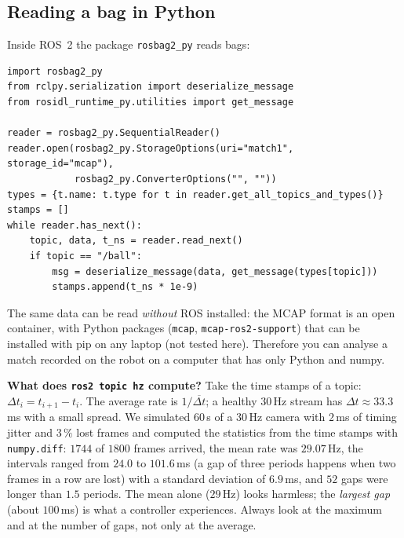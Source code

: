 \subsection*{Reading a bag in Python}
Inside ROS~2 the package \verb!rosbag2_py! reads bags:
\begin{verbatim}
import rosbag2_py
from rclpy.serialization import deserialize_message
from rosidl_runtime_py.utilities import get_message

reader = rosbag2_py.SequentialReader()
reader.open(rosbag2_py.StorageOptions(uri="match1", storage_id="mcap"),
            rosbag2_py.ConverterOptions("", ""))
types = {t.name: t.type for t in reader.get_all_topics_and_types()}
stamps = []
while reader.has_next():
    topic, data, t_ns = reader.read_next()
    if topic == "/ball":
        msg = deserialize_message(data, get_message(types[topic]))
        stamps.append(t_ns * 1e-9)
\end{verbatim}
The same data can be read \emph{without} ROS installed: the MCAP format is an open container, with Python packages (\verb!mcap!, \verb!mcap-ros2-support!) that can be installed with pip on any laptop (not tested here). Therefore you can analyse a match recorded on the robot on a computer that has only Python and numpy.

\begin{example}
\textbf{What does \verb!ros2 topic hz! compute?} Take the time stamps of a topic: $\Delta t_i=t_{i+1}-t_i$. The average rate is $1/\overline{\Delta t}$; a healthy $30$\,Hz stream has $\Delta t\approx33.3$\,ms with a small spread. We simulated $60$\,s of a $30$\,Hz camera with $2$\,ms of timing jitter and $3\,\%$ lost frames and computed the statistics from the time stamps with \verb!numpy.diff!: $1744$ of $1800$ frames arrived, the mean rate was $29.07$\,Hz, the intervals ranged from $24.0$ to $101.6$\,ms (a gap of three periods happens when two frames in a row are lost) with a standard deviation of $6.9$\,ms, and $52$ gaps were longer than $1.5$ periods. The mean alone ($29$\,Hz) looks harmless; the \emph{largest gap} (about $100$\,ms) is what a controller experiences. Always look at the maximum and at the number of gaps, not only at the average.
\end{example}

